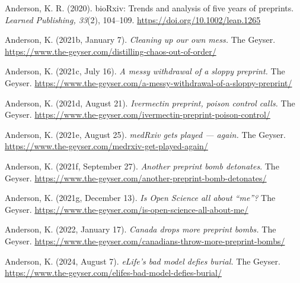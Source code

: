 \documentclass[authordate, perspective, issue]{jote-new-article}
\begin{document}
	Anderson, K. R. (2020). bioRxiv: Trends and analysis of five years of preprints. \emph{Learned Publishing, 33}(2), 104--109. \url{https://doi.org/10.1002/leap.1265}







	Anderson, K. (2021b, January 7). \emph{Cleaning up our own mess. }The Geyser. \url{https://www.the-geyser.com/distilling-chaos-out-of-order/}







	Anderson, K. (2021c, July 16). \emph{A messy withdrawal of a sloppy preprint.} The Geyser. \url{https://www.the-geyser.com/a-messy-withdrawal-of-a-sloppy-preprint/}







	Anderson, K. (2021d, August 21). \emph{Ivermectin preprint, poison control calls. }The Geyser. \url{https://www.the-geyser.com/ivermectin-preprint-poison-control/}







	Anderson, K. (2021e, August 25). \emph{medRxiv gets played — again. }The Geyser. \url{https://www.the-geyser.com/medrxiv-get-played-again/}







	Anderson, K. (2021f, September 27). \emph{Another preprint bomb detonates}. The Geyser. \url{https://www.the-geyser.com/another-preprint-bomb-detonates/}







	Anderson, K. (2021g, December 13). \emph{Is Open Science all about “me”?} The Geyser. \url{https://www.the-geyser.com/is-open-science-all-about-me/}







	Anderson, K. (2022, January 17). \emph{Canada drops more preprint bombs.} The Geyser. \url{https://www.the-geyser.com/canadians-throw-more-preprint-bombs/}







	Anderson, K. (2024, August 7). \emph{eLife's bad model defies burial.} The Geyser. \url{https://www.the-geyser.com/elifes-bad-model-defies-burial/}
\end{document}
